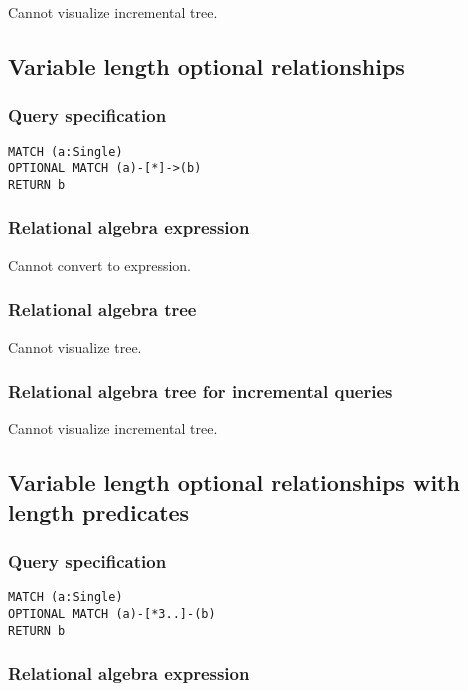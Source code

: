 Cannot visualize incremental tree.

\subsection{Variable length optional relationships}

\subsubsection*{Query specification}

\begin{lstlisting}
MATCH (a:Single)
OPTIONAL MATCH (a)-[*]->(b)
RETURN b
\end{lstlisting}

\subsubsection*{Relational algebra expression}

Cannot convert to expression.

\subsubsection*{Relational algebra tree}

Cannot visualize tree.

\subsubsection*{Relational algebra tree for incremental queries}

Cannot visualize incremental tree.

\subsection{Variable length optional relationships with length predicates}

\subsubsection*{Query specification}

\begin{lstlisting}
MATCH (a:Single)
OPTIONAL MATCH (a)-[*3..]-(b)
RETURN b
\end{lstlisting}

\subsubsection*{Relational algebra expression}


